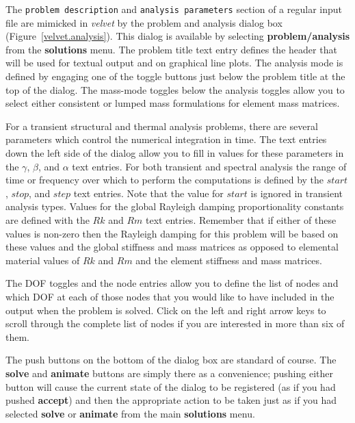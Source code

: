 The {\tt problem description} and {\tt analysis parameters} section of
a regular \felt{} input file are mimicked in {\em velvet} by the
problem and analysis dialog box (Figure~\ref{velvet.analysis}).  This
dialog is available by selecting {\bf problem/analysis} from the 
{\bf solutions} menu.  The problem title text entry defines the header
that will be used for textual output and on graphical line
plots.  The analysis mode is defined by engaging one of the 
toggle buttons just below the problem title at the top of 
the dialog.  The mass-mode toggles below the analysis toggles allow you to 
select either consistent or lumped mass formulations for element mass 
matrices. 

For a transient structural and thermal analysis problems, there are several 
parameters which control the numerical integration in time. 
The text entries down the left side of the dialog allow you to fill in values
for these parameters in the $\gamma$, $\beta$, and $\alpha$ text
entries.  For both transient and spectral analysis the range of
time or frequency over which to perform the computations is defined by
the $start$, $stop$, and $step$ text entries.  Note that the value
for $start$ is ignored in transient analysis types.  Values for the
global Rayleigh damping proportionality constants are defined with the
$Rk$ and $Rm$ text entries.  Remember that if either of these values is
non-zero then the Rayleigh damping for this problem will be based on these
values and the global stiffness and mass matrices as opposed to elemental
material values of $Rk$ and $Rm$ and the element stiffness and mass matrices.

The DOF toggles and the node entries allow you
to define the list of nodes and which DOF at each of those nodes that you
would like to have included in the output when the problem is solved.
Click on the left and right arrow keys to scroll through the complete list
of nodes if you are interested in more than six of them.

The push buttons on the bottom of the dialog box are standard of course.
The {\bf solve} and {\bf animate} buttons are simply there as a convenience; 
pushing either button will cause the current state of the dialog to be 
registered (as if you had pushed {\bf accept}) and then the appropriate 
action to be taken just as if you had selected {\bf solve} or {\bf animate} 
from the main {\bf solutions} menu.

